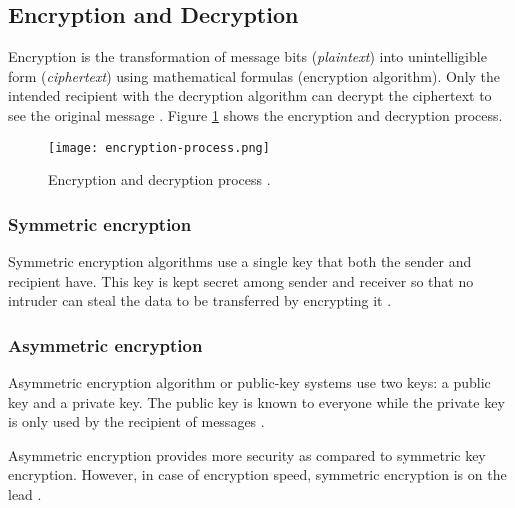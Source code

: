 \subsection{Encryption and Decryption}

Encryption is the transformation of message bits (\textit{plaintext}) into unintelligible form (\textit{ciphertext}) using mathematical formulas (encryption algorithm).
Only the intended recipient with the decryption algorithm can decrypt the ciphertext to see the original message \cite{Devi_2019}.
Figure \ref{fig:encryption-process.png} shows the encryption and decryption process.

\begin{figure}[ht]
    \centering
    \texttt{[image: encryption-process.png]}
    \caption{Encryption and decryption process \cite{Bhanot_2015}.}
    \label{fig:encryption-process.png}
\end{figure}


\subsubsection{Symmetric encryption}

Symmetric encryption algorithms use a single key that both the sender and recipient have.
This key is kept secret among sender and receiver so that no intruder can steal the data to be transferred by encrypting it  \cite{Bhanot_2015}.


\subsubsection{Asymmetric encryption}

Asymmetric encryption algorithm or public-key systems use two keys: a public key and a private key.
The public key is known to everyone while the private key is only used by the recipient of messages \cite{Bhanot_2015}.

Asymmetric encryption provides more security as compared to symmetric key encryption.
However, in case of encryption speed, symmetric encryption is on the lead \cite{Bhanot_2015}. 